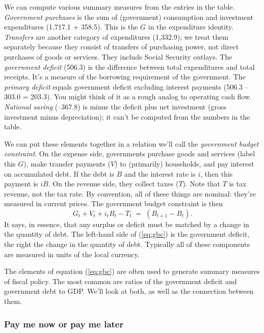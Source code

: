 \documentclass[letterpaper,12pt]{article}
\begin{document}
We can compute various summary measures from the entries in the
table.  {\it Government purchases\/} is the sum of (government)
consumption and investment expenditures (1,717.1 + 358.5). This is
the $G$ in the expenditure identity. {\it Transfers\/} are another
category of expenditures (1,332.9); we treat them separately because
they consist of transfers of purchasing power, not direct purchases
of goods or services. They include Social Security outlays. The {\it
government deficit\/} (506.3) is the difference between total
expenditures and total receipts. It's a measure of the borrowing
requirement of the government. The {\it primary deficit\/} equals
government deficit excluding interest payments (506.3 -- 303.0 = 203.3).
You might think of it as a rough analog to operating cash flow.  
{\it National saving\/} (--367.8) is minus the deficit plus net
investment (gross investment minus depreciation); it can't be
computed from the numbers in the table.


We can put these elements together in a relation we'll call 
the {\it government budget constraint\/}.
On the expense side, governments purchase goods and services 
(label this $G$), make transfer payments ($V$) to (primarily) households, 
and pay interest on accumulated debt.
If the debt is $B$ and the interest rate is $i$, then this payment 
is $iB$.
On the revenue side, they collect taxes ($T$).
Note that $T$ is tax revenue, not the tax rate.
By convention, all of these things are nominal:
they're measured in current prices.  
The government budget constraint is then 
\begin{equation}
    G_t + V_t + i_t B_t - T_t  \;=\; (B_{t+1} - B_t ) .
    \label{eq:gbc}
\end{equation}
It says, in essence, that any surplus or deficit must be matched
by a change in the quantity of debt.
The left-hand side of (\ref{eq:gbc}) 
is the government deficit, 
the right the change in the quantity of debt.
Typically all of these components are measured in 
units of the local currency. 


The elements of equation (\ref{eq:gbc}) 
are often used to generate summary measures 
of fiscal policy. 
The most common are ratios  of 
the government deficit and government debt to GDP.  
We'll look at both, as well as the connection between them.  


\subsubsection*{Pay me now or pay me later}  
\end{document}
